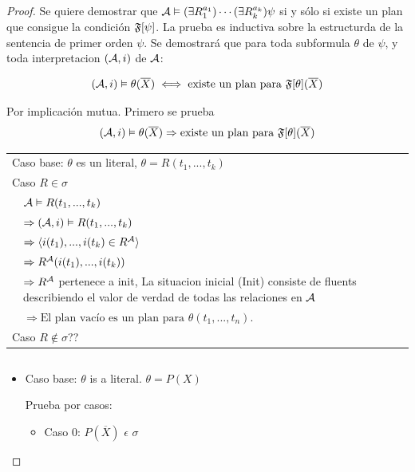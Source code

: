 \begin{proof}
Se quiere demostrar que
$\mathcal{A}\vDash(\exists R_1^{a_1})\cdots(\exists R_k^{a_k})\psi$ si y sólo si
existe un plan que consigue la condición $\mathfrak{F}[\psi]$. La prueba es inductiva
sobre la estructurda de la sentencia de primer orden $\psi$. Se demostrará que para toda subformula 
$\theta$ de $\psi$, y toda interpretacion $(\mathcal{A},i)$ de $\mathcal{A}$:

\[ (\mathcal{A},i) \vDash \theta(\overline{X}) \iff \text{existe un plan para } \mathfrak{F}[\theta](\overline{X}) \]

Por implicación mutua. Primero se prueba
\[ (\mathcal{A},i) \vDash \theta(\overline{X}) \Rightarrow \text{existe un plan para } \mathfrak{F}[\theta](\overline{X}) \]

\begin{center}
\begin{tabular}{ll}
\multicolumn{2}{l}{Caso base: $\theta$ es un literal, $\theta = R(t_1,...,t_k)$}\\
\multicolumn{2}{l}{Caso $R \in \sigma$}\\
&$\mathcal{A} \vDash R(t_1,...,t_k)$\\
&$\Rightarrow (\mathcal{A},i) \vDash R(t_1,...,t_k)$\\
&$\Rightarrow \langle i(t_1),...,i(t_k) \in R^{\mathcal{A}} \rangle$\\
&$\Rightarrow R^{\mathcal{A}}(i(t_1),...,i(t_k))$\\
&$\Rightarrow R^{\mathcal{A}}$ pertenece a init, La situacion inicial (Init) consiste
de fluents describiendo el valor de verdad de todas las relaciones en $\mathcal{A}$\\
&$\Rightarrow \text{El plan vacío es un plan para }\theta(t_1,...,t_n)$.\\
\multicolumn{2}{l}{Caso $R \not\in \sigma$??}\\
\end{tabular}
\end{center}

\begin{tabular}{ll}
\end{tabular}

\begin{itemize}
		\item Caso base: $\theta$ is a literal. $\theta = P(X)$ 
		
		Prueba por casos:
			\begin{itemize}
				\item Caso 0: $P(\overline{X})$ $\epsilon$ $\sigma$
				

\end{itemize}
\end{itemize}
\end{proof}
